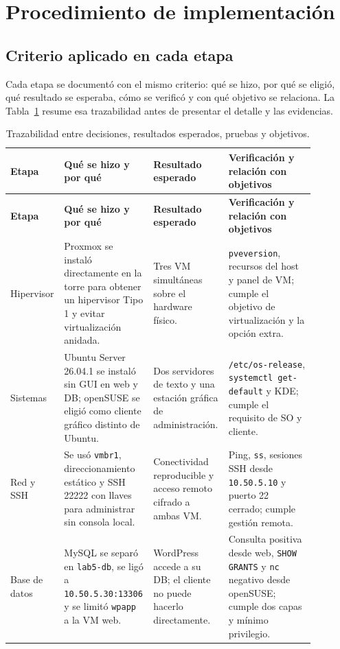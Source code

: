 \section{Procedimiento de implementación}

\subsection{Criterio aplicado en cada etapa}

Cada etapa se documentó con el mismo criterio: qué se hizo, por qué se eligió, qué resultado se esperaba, cómo se verificó y con qué objetivo se relaciona. La Tabla~\ref{tab:trazabilidad-etapas} resume esa trazabilidad antes de presentar el detalle y las evidencias.

\small
\begin{longtable}{p{0.13\linewidth}p{0.25\linewidth}p{0.22\linewidth}p{0.28\linewidth}}
\caption{Trazabilidad entre decisiones, resultados esperados, pruebas y objetivos.}\label{tab:trazabilidad-etapas}\\
\toprule
\textbf{Etapa} & \textbf{Qué se hizo y por qué} & \textbf{Resultado esperado} & \textbf{Verificación y relación con objetivos} \\
\midrule
\endfirsthead
\toprule
\textbf{Etapa} & \textbf{Qué se hizo y por qué} & \textbf{Resultado esperado} & \textbf{Verificación y relación con objetivos} \\
\midrule
\endhead
Hipervisor & Proxmox se instaló directamente en la torre para obtener un hipervisor Tipo 1 y evitar virtualización anidada. & Tres VM simultáneas sobre el hardware físico. & \texttt{pveversion}, recursos del host y panel de VM; cumple el objetivo de virtualización y la opción extra. \\
Sistemas & Ubuntu Server 26.04.1 se instaló sin GUI en web y DB; openSUSE se eligió como cliente gráfico distinto de Ubuntu. & Dos servidores de texto y una estación gráfica de administración. & \texttt{/etc/os-release}, \texttt{systemctl get-default} y KDE; cumple el requisito de SO y cliente. \\
Red y SSH & Se usó \texttt{vmbr1}, direccionamiento estático y SSH 22222 con llaves para administrar sin consola local. & Conectividad reproducible y acceso remoto cifrado a ambas VM. & Ping, \texttt{ss}, sesiones SSH desde \texttt{10.50.5.10} y puerto 22 cerrado; cumple gestión remota. \\
Base de datos & MySQL se separó en \texttt{lab5-db}, se ligó a \texttt{10.50.5.30:13306} y se limitó \texttt{wpapp} a la VM web. & WordPress accede a su DB; el cliente no puede hacerlo directamente. & Consulta positiva desde web, \texttt{SHOW GRANTS} y \texttt{nc} negativo desde openSUSE; cumple dos capas y mínimo privilegio. \\

\end{longtable}
